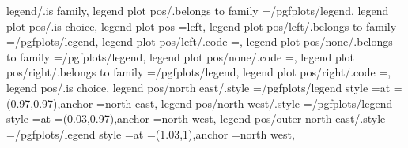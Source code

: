 legend/.is family,
legend plot pos/.belongs to family                                 =/pgfplots/legend,                                                                                                                  
legend plot pos/.is choice,
legend plot pos                                                    =left,                                                                                                                              
legend plot pos/left/.belongs to family                            =/pgfplots/legend,                                                                                                                  
legend plot pos/left/.code                                         ={\def\pgfplots@legend@plot@pos{0}},                                                                                                
legend plot pos/none/.belongs to family                            =/pgfplots/legend,                                                                                                                  
legend plot pos/none/.code                                         ={\def\pgfplots@legend@plot@pos{2}},                                                                                                
legend plot pos/right/.belongs to family                           =/pgfplots/legend,                                                                                                                  
legend plot pos/right/.code                                        ={\def\pgfplots@legend@plot@pos{1}},                                                                                                
legend pos/.is choice,
legend pos/north east/.style                                       ={/pgfplots/legend style                                                                                                            ={at                                                       ={(0.97,0.97)},anchor                                                                                                     =north east}},
legend pos/north west/.style                                       ={/pgfplots/legend style                                                                                                            ={at                                                       ={(0.03,0.97)},anchor                                                                                                     =north west}},
legend pos/outer north east/.style                                 ={/pgfplots/legend style                                                                                                            ={at                                                       ={(1.03,1)},anchor                                                                                                        =north west}},
